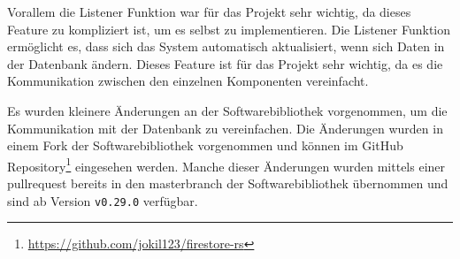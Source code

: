Vorallem die Listener Funktion war für das Projekt sehr wichtig, da dieses Feature zu kompliziert ist, um es selbst zu implementieren. Die Listener Funktion ermöglicht es, dass sich das System automatisch aktualisiert, wenn sich Daten in der Datenbank ändern. Dieses Feature ist für das Projekt sehr wichtig, da es die Kommunikation zwischen den einzelnen Komponenten vereinfacht.

Es wurden kleinere Änderungen an der Softwarebibliothek vorgenommen, um die Kommunikation mit der Datenbank zu vereinfachen. Die Änderungen wurden in einem Fork der Softwarebibliothek vorgenommen und können im GitHub Repository\footnote{\url{https://github.com/jokil123/firestore-rs}} eingesehen werden. Manche dieser Änderungen wurden mittels einer \Gls{pullrequest} bereits in den \Gls{masterbranch} der Softwarebibliothek übernommen und sind ab Version \texttt{v0.29.0} verfügbar.